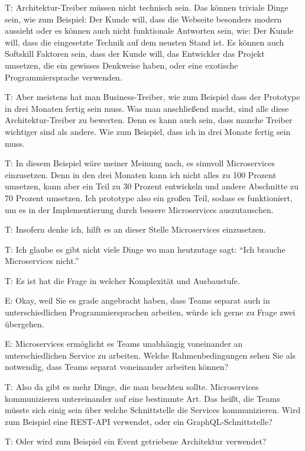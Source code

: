 T: Architektur-Treiber müssen nicht technisch sein. Das können triviale Dinge sein, wie zum Beispiel: Der Kunde will, dass die Webseite besonders modern aussieht oder es können auch nicht funktionale Antworten sein, wie: Der Kunde will, dass die eingesetzte Technik auf dem neusten Stand ist. Es können auch Softskill Faktoren sein, dass der Kunde will, das Entwickler das Projekt umsetzen, die ein gewisses Denkweise haben, oder eine exotische Programmiersprache verwenden. 

\label{appendix:t-15}
T: Aber meistens hat man Business-Treiber, wie zum Beispiel dass der Prototype in drei Monaten fertig sein muss. Was man anschließend macht, sind alle diese Architektur-Treiber zu bewerten. Denn es kann auch sein, dass manche Treiber wichtiger sind als andere. Wie zum Beispiel, dass ich in drei Monate fertig sein muss. 

\label{appendix:t-16}
T: In diesem Beispiel wäre meiner Meinung nach, es sinnvoll Microservices einzusetzen. Denn in den drei Monaten kann ich nicht alles zu 100 Prozent umsetzen, kann aber ein Teil zu 30 Prozent entwickeln und andere Abschnitte zu 70 Prozent umsetzen. Ich prototype also ein großen Teil, sodass es funktioniert, um es in der Implementierung durch bessere Microservices auszutauschen. 

T: Insofern denke ich, hilft es an dieser Stelle Microservices einzusetzen.

\label{appendix:t-17}
T: Ich glaube es gibt nicht viele Dinge wo man heutzutage sagt: “Ich brauche Microservices nicht.”

\label{appendix:t-18}
T: Es ist hat die Frage in welcher Komplexität und Ausbaustufe.

E: Okay, weil Sie es grade angebracht haben, dass Teams separat auch in unterschiedlichen Programmiersprachen arbeiten, würde ich gerne zu Frage zwei übergehen.

E: Microservices ermöglicht es Teams unabhängig voneinander an unterschiedlichen Service zu arbeiten. Welche Rahmenbedingungen sehen Sie als notwendig, dass Teams separat voneinander arbeiten können?

\label{appendix:t-19}
T: Also da gibt es mehr Dinge, die man beachten sollte. Microservices kommunizieren untereinander auf eine bestimmte Art. Das heißt, die Teams müsste sich einig sein über welche Schnittstelle die Services kommunizieren. Wird zum Beispiel eine REST-API verwendet, oder ein GraphQL-Schnittstelle?
 
 \label{appendix:t-20}
T: Oder wird zum Beispiel ein Event getriebene Architektur verwendet?

